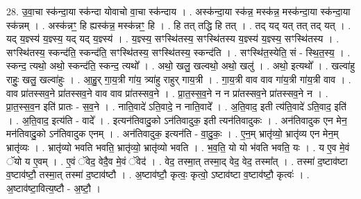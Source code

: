 \documentclass[17pt]{extarticle}
\begin{document}
28. उ॒वा॒चा स्क॑न्दा॒या स्क॑न्दा योवाचो वा॒चा स्क॑न्दाय । . अस्क॑न्दा॒या स्क॑न्न॒ मस्क॑न्न॒ मस्क॑न्दा॒या स्क॑न्दा॒या स्क॑न्नम् । . अस्क॑न्नꣳ॒॒ हि ह्यस्क॑न्न॒ मस्क॑न्नꣳ॒॒ हि । . हि तत् तद्धि हि तत् । . तद् यद् यत् तत् तद् यत् । . यद् य॒ज्ञ्स्य॑ य॒ज्ञ्स्य॒ यद् यद् य॒ज्ञ्स्य॑ । . य॒ज्ञ्स्य॒ सꣳस्थि॑तस्य॒ सꣳस्थि॑तस्य य॒ज्ञ्स्य॑ य॒ज्ञ्स्य॒ सꣳस्थि॑तस्य । . सꣳस्थि॑तस्य॒ स्कन्द॑ति॒ स्कन्द॑ति॒ सꣳस्थि॑तस्य॒ सꣳस्थि॑तस्य॒ स्कन्द॑ति । . सꣳस्थि॑त॒स्येति॒ सं - स्थि॒त॒स्य॒ । . स्कन्द॒ त्यथो॒ अथो॒ स्कन्द॑ति॒ स्कन्द॒ त्यथो᳚ । . अथो॒ खलु॒ खल्वथो॒ अथो॒ खलु॑ । . अथो॒ इत्यथो᳚ । . खल्वा॑हु राहुः॒ खलु॒ खल्वा॑हुः । . आ॒हु॒र् गा॒य॒त्री गा॑य॒ त्र्या॑हु राहुर् गाय॒त्री । . गा॒य॒त्री वाव वाव गा॑य॒त्री गा॑य॒त्री वाव । . वाव प्रा॑तस्सव॒ने प्रा॑तस्सव॒ने वाव वाव प्रा॑तस्सव॒ने । . प्रा॒त॒स्स॒व॒ने न न प्रा॑तस्सव॒ने प्रा॑तस्सव॒ने न । . प्रा॒त॒स्स॒व॒न इति॑ प्रातः - स॒व॒ने । . नाति॒वादे॑ ऽति॒वादे॒ न नाति॒वादे᳚ । . अ॒ति॒वाद॒ इती त्य॑ति॒वादे॑ ऽति॒वाद॒ इति॑ । . अ॒ति॒वाद॒ इत्य॑ति - वादे᳚ । . इत्यन॑तिवादु॒को ऽन॑तिवादुक॒ इती त्यन॑तिवादुकः । . अन॑तिवादुक एन मेन॒ मन॑तिवादु॒को ऽन॑तिवादुक एनम् । . अन॑तिवादुक॒ इत्यन॑ति - वा॒दु॒कः॒ । . ए॒न॒म् भ्रातृ॑व्यो॒ भ्रातृ॑व्य एन मेन॒म् भ्रातृ॑व्यः । . भ्रातृ॑व्यो भवति भवति॒ भ्रातृ॑व्यो॒ भ्रातृ॑व्यो भवति । . भ॒व॒ति॒ यो यो भ॑वति भवति॒ यः । . य ए॒व मे॒वं ॅयो य ए॒वम् । . ए॒वं ॅवेद॒ वेदै॒व मे॒वं ॅवेद॑ । . वेद॒ तस्मा॒त् तस्मा॒द् वेद॒ वेद॒ तस्मा᳚त् । . तस्मा॑ द॒ष्टाव॑ष्टा व॒ष्टाव॑ष्टौ॒ तस्मा॒त् तस्मा॑ द॒ष्टाव॑ष्टौ । . अ॒ष्टाव॑ष्टौ॒ कृत्वः॒ कृत्वो॒ ऽष्टाव॑ष्टा व॒ष्टाव॑ष्टौ॒ कृत्वः॑ । . अ॒ष्टाव॑ष्टा॒वित्य॒ष्टौ - अ॒ष्टौ॒ । \newline
\end{document}

